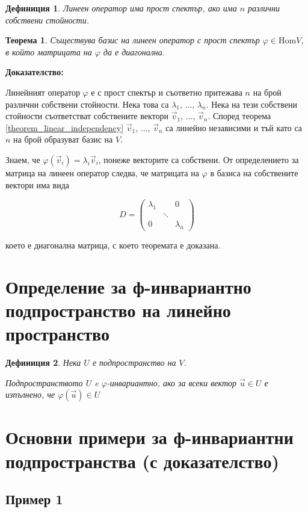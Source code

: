 \documentclass{scrartcl}
\newtheorem{theorem}{Теорема}
\newtheorem{definition}{Дефиниция}
\begin{document}
\begin{FlushLeft}
\begin{definition}
Линеен оператор има прост спектър, ако има $n$ различни собствени стойности.
\end{definition}

\begin{theorem}
Съществува базис на линеен оператор с прост спектър $\varphi \in \text{Hom}{V}$, в който матрицата на $\varphi$ да е диагонална.
\end{theorem}

\textbf{Доказателство:}

Линейният оператор $\varphi$ е с прост спектър и съответно притежава $n$ на брой различни собствени стойности. Нека това са $\lambda_1$, $\dots$, $\lambda_n$. Нека на тези собствени стойности съответстват собствените вектори $\vec{v}_1$, $\dots$, $\vec{v}_n$. Според теорема \ref{theorem_linear_independency} $\vec{v}_1$, $\dots$, $\vec{v}_n$ са линейно независими и тъй като са $n$ на брой образуват базис на $V$.

Знаем, че $\varphi(\vec{v}_i) = \lambda_i \vec{v}_i$, понеже векторите са собствени. От определението за матрица на линеен оператор следва, че матрицата на $\varphi$ в базиса на собствените вектори има вида

$$
D =
\begin{pmatrix}
    \lambda_1 & & 0\\
    & \ddots &\\
    0 & & \lambda_n
\end{pmatrix}
$$

което е диагонална матрица, с което теоремата е доказана.

\section{Определение за ф-инвариантно
подпространство на линейно пространство}

\begin{definition}
Нека $U$ е подпространство на $V$.

Подпространството $U$ e $\varphi$-инвариантно, ако за всеки вектор $\vec{u} \in U$ е изпълнено, че $\varphi(\vec{u}) \in U$
\end{definition}

\section{Основни примери за ф-инвариантни
подпространства (с доказателство)}

\subsection{Пример 1}


\end{FlushLeft}
\end{document}
